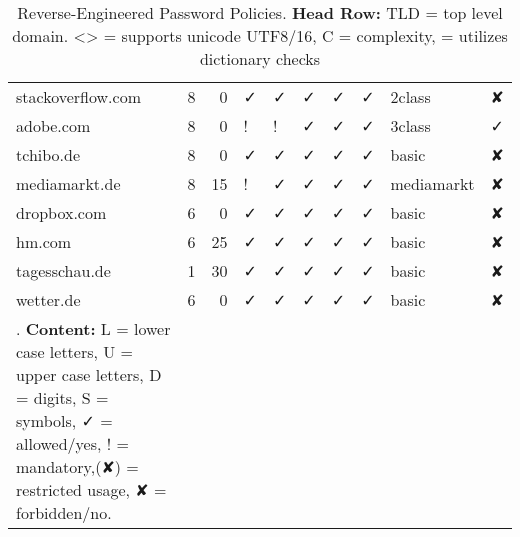 {\begin{longtable}{lrrlllllll}
		stackoverflow.com & 8     & 0     & ✓ & ✓ & ✓ & ✓ & ✓ & 2class & ✘\\
		adobe.com & 8     & 0     & ! & ! & ✓ & ✓ & ✓ & 3class & ✓\\
		tchibo.de & 8     & 0     & ✓ & ✓ & ✓ & ✓ & ✓ & basic & ✘\\
		mediamarkt.de & 8     & 15    & ! & ✓ & ✓ & ✓ & ✓ & mediamarkt & ✘\\
		dropbox.com & 6     & 0     & ✓ & ✓ & ✓ & ✓ & ✓ & basic & ✘\\
		hm.com & 6     & 25    & ✓ & ✓ & ✓ & ✓ & ✓ & basic & ✘\\
		tagesschau.de & 1     & 30    & ✓ & ✓ & ✓ & ✓ & ✓ & basic & ✘\\
		wetter.de & 6     & 0     & ✓ & ✓ & ✓ & ✓ & ✓ & basic & ✘\\
		\caption{\label{tab:appendix:policies} Reverse-Engineered Password Policies. \textbf{Head Row:} TLD = top level domain. <> = supports unicode UTF8/16, C = complexity, \emoji{1F4D6} = utilizes dictionary checks}. \textbf{Content:} L = lower case letters, U = upper case letters, D = digits, S = symbols, ✓ = allowed/yes, ! = mandatory,(✘) = restricted usage, ✘ = forbidden/no.
	\end{longtable}%
}%
\clearpage